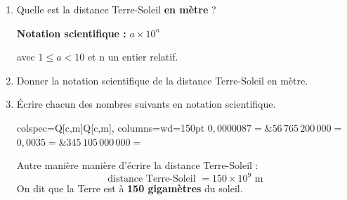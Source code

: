 \documentclass[../main.tex]{subfiles}
\begin{document}
    \begin{enumerate}[1),font=\bfseries]
        \item Quelle est la distance Terre-Soleil \textbf{en mètre} ?
        \dotedline
        \begin{simplebox}
            \textbf{Notation scientifique : }$a\times10^n$\par
            avec $1\leq a<10$ et n un entier relatif.
        \end{simplebox}
        \item Donner la notation scientifique de la distance Terre-Soleil en mètre.
        \dotedline
        \item Écrire chacun des nombres suivants en notation scientifique.\par\noindent
        \begin{center}
            \begin{tblr}{   
                colspec={Q[c,m]Q[c,m]},
                columns={wd=150pt}
            }
                $0,0000087=$&$56\,765\,200\,000=$\\
                $0,0035=$&$345\,105\,000\,000=$
            \end{tblr}
        \end{center}
        \begin{simplebox}
            Autre manière manière d'écrire la distance Terre-Soleil :
            $$\text{distance Terre-Soleil }=150\times10^{9}\text{ m}$$
            On dit que la Terre est à \textbf{150 gigamètres} du soleil.
        \end{simplebox}
    \end{enumerate}
\end{document}
